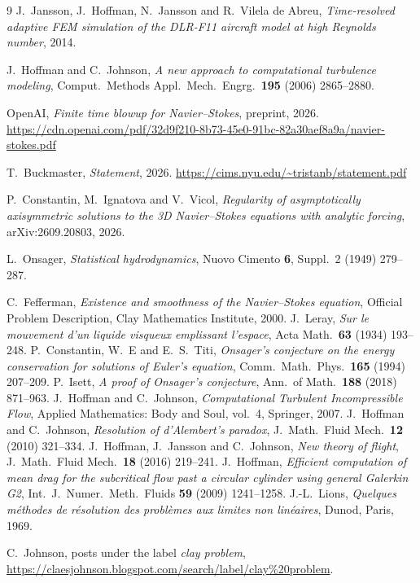 \documentclass[11pt]{article}
\begin{document}
\begin{thebibliography}{9}
 J.~Jansson, J.~Hoffman, N.~Jansson and R.~Vilela de Abreu, \emph{Time-resolved
adaptive FEM simulation of the DLR-F11 aircraft model at high Reynolds number}, 2014.

 J.~Hoffman and C.~Johnson, \emph{A new approach to computational turbulence
modeling}, Comput.\ Methods Appl.\ Mech.\ Engrg.\ \textbf{195} (2006) 2865--2880.

 OpenAI, \emph{Finite time blowup for Navier--Stokes}, preprint, 2026.
\newblock \url{https://cdn.openai.com/pdf/32d9f210-8b73-45e0-91bc-82a30aef8a9a/navier-stokes.pdf}

 T.~Buckmaster, \emph{Statement}, 2026.
\newblock \url{https://cims.nyu.edu/~tristanb/statement.pdf}

 P.~Constantin, M.~Ignatova and V.~Vicol, \emph{Regularity of asymptotically
axisymmetric solutions to the 3D Navier--Stokes equations with analytic forcing},
arXiv:2609.20803, 2026.

 L.~Onsager, \emph{Statistical hydrodynamics}, Nuovo Cimento \textbf{6},
Suppl.~2 (1949) 279--287.

 C.~Fefferman, \emph{Existence and smoothness of the Navier--Stokes equation},
Official Problem Description, Clay Mathematics Institute, 2000.
 J.~Leray, \emph{Sur le mouvement d'un liquide visqueux emplissant l'espace},
Acta Math.\ \textbf{63} (1934) 193--248.
 P.~Constantin, W.~E and E.~S.~Titi, \emph{Onsager's conjecture on the energy
conservation for solutions of Euler's equation}, Comm.\ Math.\ Phys.\ \textbf{165} (1994) 207--209.
 P.~Isett, \emph{A proof of Onsager's conjecture}, Ann.\ of Math.\ \textbf{188}
(2018) 871--963.
 J.~Hoffman and C.~Johnson, \emph{Computational Turbulent Incompressible Flow},
Applied Mathematics: Body and Soul, vol.~4, Springer, 2007.
 J.~Hoffman and C.~Johnson, \emph{Resolution of d'Alembert's paradox},
J.\ Math.\ Fluid Mech.\ \textbf{12} (2010) 321--334.
 J.~Hoffman, J.~Jansson and C.~Johnson, \emph{New theory of flight},
J.\ Math.\ Fluid Mech.\ \textbf{18} (2016) 219--241.
 J.~Hoffman, \emph{Efficient computation of mean drag for the subcritical flow past a
circular cylinder using general Galerkin G2}, Int.\ J.\ Numer.\ Meth.\ Fluids \textbf{59} (2009)
1241--1258.
 J.-L.~Lions, \emph{Quelques m\'ethodes de r\'esolution des probl\`emes aux
limites non lin\'eaires}, Dunod, Paris, 1969.

 C.~Johnson, posts under the label \emph{clay problem},
\url{https://claesjohnson.blogspot.com/search/label/clay\%20problem}.
\end{thebibliography}
\end{document}
